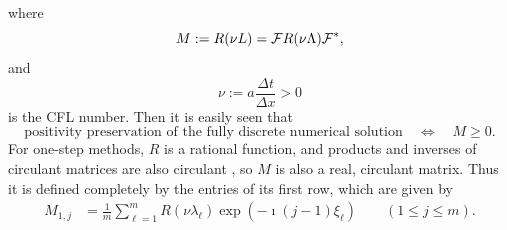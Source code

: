 \documentclass[a4paper]{article}
\newcommand{\dt}{\Delta t}
\newcommand{\dx}{\Delta x}
\newcommand{\cF}{{\cal{F}}}
\begin{document}
where 
\begin{equation}\label{Mdualdef}
M:=R(\nu L)=\cF R(\nu \Lambda) \cF^*, 
\end{equation}
and 
\begin{equation}\label{nudef}
\nu:=a\frac{\dt}{\dx}>0
\end{equation}
is the CFL number.  
Then it is easily seen that 
\[
\boxed{\text{positivity preservation of the fully discrete numerical solution}\quad \Longleftrightarrow \quad M\ge 0.}
\]
For one-step methods, $R$ is a rational function, and products and inverses of circulant matrices are also circulant \cite[Fact 5.16.7]{matmat}, so
$M$ is also a real, circulant matrix.
Thus it is defined completely by the entries of its first row, which
are given by
\begin{align} \label{M-entries}
    M_{1,j} & = \frac{1}{m} \sum_{\ell=1}^m R(\nu\lambda_\ell) \exp(-\imath(j-1)\xi_\ell) \quad\quad (1\le j\le m).
\end{align}
\end{document}
